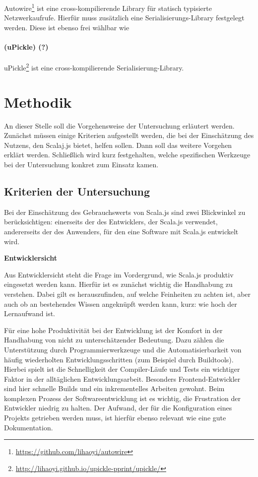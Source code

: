 \documentclass[a4paper, 12pt, hidelinks, listof=totoc, listoftables=totoc, bibliography=totoc]{scrreprt}
\newcommand{\MyMiniSec}[1]{\rmfamily\fontsize{12}{15}\selectfont
	\vspace{7pt}\textbf{#1} %
}
\begin{document}
Autowire\footnote{\url{https://github.com/lihaoyi/autowire}} ist eine cross-kompilierende Library für statisch typisierte Netzwerkaufrufe. Hierfür muss zusätzlich eine Serialisierungs-Library festgelegt werden. Diese ist ebenso frei wählbar wie 

\subsubsection{(uPickle) (?)}

uPickle\footnote{\url{http://lihaoyi.github.io/upickle-pprint/upickle/}} ist eine cross-kompilierende Serialisierung-Library.



\chapter{Methodik}\label{chap:methods}

An dieser Stelle soll die Vorgehensweise der Untersuchung erläutert werden. Zunächst müssen einige Kriterien aufgestellt werden, die bei der Einschätzung des Nutzens, den Scalaj.js bietet, helfen sollen. Dann soll das weitere Vorgehen erklärt werden. Schließlich wird kurz festgehalten, welche spezifischen Werkzeuge bei der Untersuchung konkret zum Einsatz kamen.

\section{Kriterien der Untersuchung}

Bei der Einschätzung des Gebrauchswerts von Scala.js sind zwei Blickwinkel zu berücksichtigen: einerseits der des Entwicklers, der Scala.js verwendet, andererseits der des Anwenders, für den eine Software mit Scala.js entwickelt wird.

\MyMiniSec{Entwicklersicht}

Aus Entwicklersicht steht die Frage im Vordergrund, wie Scala.js produktiv eingesetzt werden kann. Hierfür ist es zunächst wichtig die Handhabung zu verstehen. Dabei gilt es herauszufinden, auf welche Feinheiten zu achten ist, aber auch ob an bestehendes Wissen angeknüpft werden kann, kurz: wie hoch der Lernaufwand ist.

Für eine hohe Produktivität bei der Entwicklung ist der Komfort in der Handhabung von nicht zu unterschätzender Bedeutung. Dazu zählen die Unterstützung durch Programmierwerkzeuge und die Automatisierbarkeit von häufig wiederholten Entwicklungsschritten (zum Beispiel durch Buildtools). Hierbei spielt ist die Schnelligkeit der Compiler-Läufe und Tests ein wichtiger Faktor in der alltäglichen Entwicklungsarbeit. Besonders Frontend-Entwickler sind hier schnelle Builds und ein inkrementelles Arbeiten gewohnt. Beim komplexen Prozess der Softwareentwicklung ist es wichtig, die Frustration der Entwickler niedrig zu halten. Der Aufwand, der für die Konfiguration eines Projekts getrieben werden muss, ist hierfür ebenso relevant wie eine gute Dokumentation.
\end{document}
